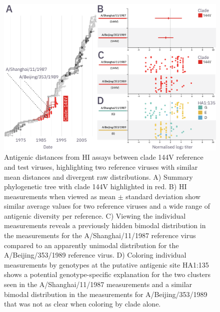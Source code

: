 \documentclass[utf8]{FrontiersinHarvard} %
\begin{document}
\begin{figure}[h!]
  \begin{center}
    \includegraphics[width=\textwidth]{figures/figure-4}
  \end{center}
  \caption{
    Antigenic distances from HI assays between clade 144V reference and test viruses, highlighting two reference viruses with similar mean distances and divergent raw distributions.
    A) Summary phylogenetic tree with clade 144V highlighted in red.
    B) HI measurements when viewed as mean $\pm$ standard deviation show similar average values for two reference viruses and a wide range of antigenic diversity per reference.
    C) Viewing the individual measurements reveals a previously hidden bimodal distribution in the measurements for the A/Shanghai/11/1987 reference virus compared to an apparently unimodal distribution for the A/Beijing/353/1989 reference virus.
    D) Coloring individual measurements by genotypes at the putative antigenic site HA1:135 shows a potential genotype-specific explanation for the two clusters seen in the A/Shanghai/11/1987 measurements and a similar bimodal distribution in the measurements for A/Beijing/353/1989 that was not as clear when coloring by clade alone.
  }
  \label{fig:4}
\end{figure}

\end{document}
